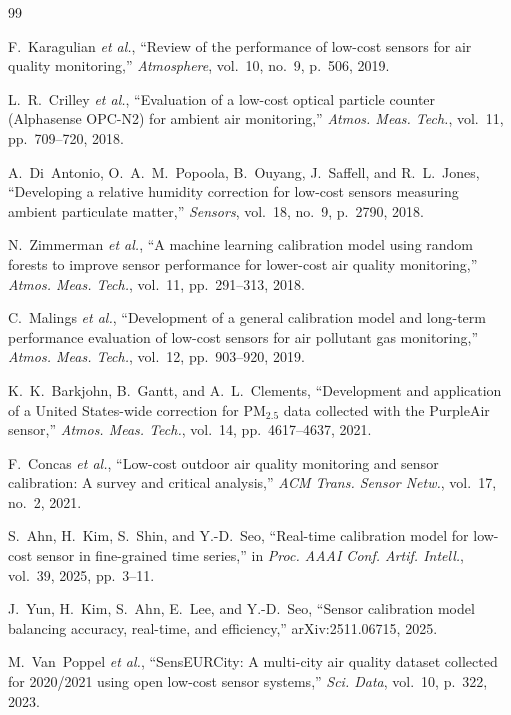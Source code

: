 \documentclass[journal]{IEEEtran}
\begin{document}
\begin{thebibliography}{99}

 F.~Karagulian \emph{et al.}, ``Review of the performance of low-cost sensors for air quality
monitoring,'' \emph{Atmosphere}, vol.~10, no.~9, p.~506, 2019.

 L.~R.~Crilley \emph{et al.}, ``Evaluation of a low-cost optical particle counter (Alphasense
OPC-N2) for ambient air monitoring,'' \emph{Atmos. Meas. Tech.}, vol.~11, pp.~709--720, 2018.

 A.~Di~Antonio, O.~A.~M.~Popoola, B.~Ouyang, J.~Saffell, and R.~L.~Jones, ``Developing a
relative humidity correction for low-cost sensors measuring ambient particulate matter,'' \emph{Sensors}, vol.~18,
no.~9, p.~2790, 2018.

 N.~Zimmerman \emph{et al.}, ``A machine learning calibration model using random forests to
improve sensor performance for lower-cost air quality monitoring,'' \emph{Atmos. Meas. Tech.}, vol.~11, pp.~291--313,
2018.

 C.~Malings \emph{et al.}, ``Development of a general calibration model and long-term performance
evaluation of low-cost sensors for air pollutant gas monitoring,'' \emph{Atmos. Meas. Tech.}, vol.~12, pp.~903--920,
2019.

 K.~K.~Barkjohn, B.~Gantt, and A.~L.~Clements, ``Development and application of a United
States-wide correction for PM$_{2.5}$ data collected with the PurpleAir sensor,'' \emph{Atmos. Meas. Tech.}, vol.~14,
pp.~4617--4637, 2021.

 F.~Concas \emph{et al.}, ``Low-cost outdoor air quality monitoring and sensor calibration: A
survey and critical analysis,'' \emph{ACM Trans. Sensor Netw.}, vol.~17, no.~2, 2021.

 S.~Ahn, H.~Kim, S.~Shin, and Y.-D.~Seo, ``Real-time calibration model for low-cost sensor in
fine-grained time series,'' in \emph{Proc. AAAI Conf. Artif. Intell.}, vol.~39, 2025, pp.~3--11.

 J.~Yun, H.~Kim, S.~Ahn, E.~Lee, and Y.-D.~Seo, ``Sensor calibration model balancing accuracy,
real-time, and efficiency,'' arXiv:2511.06715, 2025.

 M.~Van~Poppel \emph{et al.}, ``SensEURCity: A multi-city air quality dataset collected for
2020/2021 using open low-cost sensor systems,'' \emph{Sci. Data}, vol.~10, p.~322, 2023.


\end{thebibliography}
\end{document}
